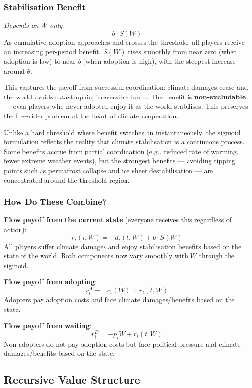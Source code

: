 \documentclass[12pt,a4paper]{article}
\begin{document}
\subsubsection{Stabilisation Benefit}

\textit{Depends on $W$ only.}
\[
  b \cdot S(W)
\]
As cumulative adoption approaches and crosses the threshold, all players receive an increasing per-period benefit. $S(W)$ rises smoothly from near zero (when adoption is low) to near $b$ (when adoption is high), with the steepest increase around $\theta$.

This captures the payoff from successful coordination: climate damages cease and the world avoids catastrophic, irreversible harm. The benefit is \textbf{non-excludable} --- even players who never adopted enjoy it as the world stabilises. This preserves the free-rider problem at the heart of climate cooperation.

Unlike a hard threshold where benefit switches on instantaneously, the sigmoid formulation reflects the reality that climate stabilisation is a continuous process. Some benefits accrue from partial coordination (e.g., reduced rate of warming, fewer extreme weather events), but the strongest benefits --- avoiding tipping points such as permafrost collapse and ice sheet destabilisation --- are concentrated around the threshold region.

\subsubsection{How Do These Combine?}

\noindent\textbf{Flow payoff from the current state} (everyone receives this regardless of action):
\[
  r_i(t, W) = -d_i(t, W) + b \cdot S(W)
\]
All players suffer climate damages and enjoy stabilisation benefits based on the state of the world. Both components now vary smoothly with $W$ through the sigmoid.

\noindent\textbf{Flow payoff from adopting}:
\[
  r_i^A = -c_i(W) + r_i(t, W)
\]
Adopters pay adoption costs and face climate damages/benefits based on the state.

\noindent\textbf{Flow payoff from waiting}:
\[
  r_i^D = -p_i W + r_i(t, W)
\]
Non-adopters do not pay adoption costs but face political pressure and climate damages/benefits based on the state.

\subsection{Recursive Value Structure}
\end{document}
